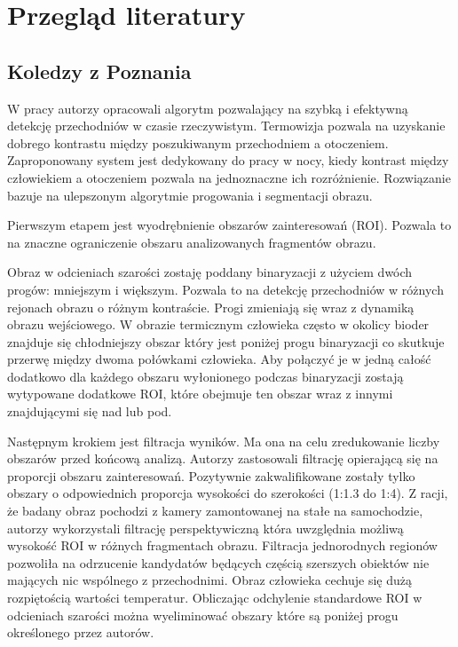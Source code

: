 \chapter{Przegląd literatury}
\label{cha:przegLiter}


\section{Koledzy z Poznania}
W pracy \cite{kolzpoz} autorzy opracowali algorytm pozwalający na szybką i efektywną detekcję przechodniów w czasie rzeczywistym. 
Termowizja pozwala na uzyskanie dobrego kontrastu między poszukiwanym przechodniem a otoczeniem. 
Zaproponowany system jest dedykowany do pracy w nocy, kiedy kontrast między człowiekiem a otoczeniem pozwala na jednoznaczne ich rozróżnienie. %
Rozwiązanie bazuje na ulepszonym algorytmie progowania i segmentacji obrazu. 

Pierwszym etapem jest wyodrębnienie obszarów zainteresowań (ROI).
Pozwala to na znaczne ograniczenie obszaru analizowanych fragmentów obrazu. %

Obraz w odcieniach szarości zostaję poddany binaryzacji z użyciem dwóch progów: mniejszym i większym. Pozwala to na detekcję przechodniów w różnych rejonach obrazu o różnym kontraście. 
Progi zmieniają się wraz z dynamiką obrazu wejściowego. 
W obrazie termicznym człowieka często w okolicy bioder znajduje się chłodniejszy obszar który jest poniżej progu binaryzacji co skutkuje przerwę między dwoma połówkami człowieka. Aby połączyć je w jedną całość dodatkowo dla każdego obszaru wyłonionego podczas binaryzacji zostają wytypowane dodatkowe ROI, które obejmuje ten obszar wraz z innymi znajdującymi się nad lub pod. 

Następnym krokiem jest filtracja wyników. 
Ma ona na celu zredukowanie liczby obszarów przed końcową analizą. 
Autorzy zastosowali filtrację opierającą się na proporcji obszaru zainteresowań. 
Pozytywnie zakwalifikowane zostały tylko obszary o odpowiednich proporcja wysokości do szerokości (1:1.3 do 1:4). 
Z racji, że badany obraz pochodzi z kamery zamontowanej na stałe na samochodzie, autorzy wykorzystali filtrację perspektywiczną która uwzględnia możliwą wysokość ROI w różnych fragmentach obrazu. %
Filtracja jednorodnych regionów pozwoliła na odrzucenie kandydatów będących częścią szerszych obiektów nie mających nic wspólnego z przechodnimi. Obraz człowieka cechuje się dużą rozpiętością wartości temperatur. Obliczając odchylenie standardowe ROI w odcieniach szarości można wyeliminować obszary które są poniżej progu określonego przez autorów.  %

